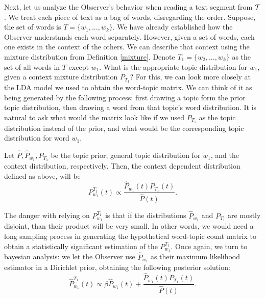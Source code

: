 Next, let us analyze the Observer's behavior when reading a text
segment from ${\mathcal T}$. We treat each piece of text as a bag of words,
disregarding the order. Suppose, the set of words is $T=\{w_1,...,w_k\}$. We
have already established how the Observer understands each word
separately. However, given a set of words, each one exists in the
context of the others. We can describe that context using the mixture
distribution from Definition \ref{mixture}. Denote
$T_1=\{w_2,...,w_k\}$ as the set of all words in $T$ except
$w_1$. What is the appropriate topic distribution for $w_1$, given a
context mixture distribution $P_{T_1}$? For this, we can look more
closely at the LDA model we used to obtain the word-topic matrix. We
can think of it as being generated by the following process: first
drawing a topic form the prior topic distribution, then drawing a word
from that topic's word distribution. It is natural to ask what would
the matrix look like if we used $P_{T_1}$ as the topic distribution
instead of the prior, and what would be the corresponding topic
distribution for word $w_1$. 

\bep
Let $\widehat{P},\widehat{P}_{w_1},P_{T_1}$ be the topic prior, general
topic distribution for $w_1$, and the context distribution,
respectively. Then, the context dependent distribution defined as
above, will be
\[P^{T_1}_{w_1}(t)\propto \frac{\widehat{P}_{w_1}\!(t)P_{T_1}\!(t)}{\widehat{P}(t)}.\]
\eep

The danger with relying on $P^{T_1}_{w_1}$
is that if the distributions $\widehat{P}_{w_1}$ and $P_{T_1}$ are
mostly disjoint, than their product will be very small. In other
words, we would need a long sampling process in generating the
hypothetical word-topic count matrix to obtain a statistically
significant estimation of the $P^{T_1}_{w_1}$. Once again,
we turn to bayesian analysis: we let the Observer use
$\widehat{P}_{w_1}$ as their maximum likelihood estimator in a
Dirichlet prior, obtaining the following posterior solution:
\[\widehat{P}^{T_1}_{w_1}(t)\propto \beta \widehat{P}_{w_1}\!(t) + \frac{\widehat{P}_{w_1}\!(t)P_{T_1}\!(t)}{\widehat{P}(t)}.\]
